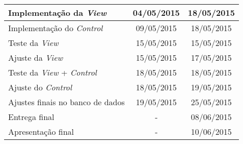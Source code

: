 \documentclass[a4paper,12pt]{article}
\begin{document}
{\begin{longtable}{|l|c|c|}
\hline
\rowcolor{ultramarineblue}
Implementação da \textit{View}            & 04/05/2015                           & 18/05/2015                        \\ \hline

\hline
\rowcolor{ultramarineblue}
Implementação do \textit{Control}         & 09/05/2015                           & 18/05/2015                        \\ \hline



Teste da \textit{View}                    & 15/05/2015                           & 15/05/2015                        \\ \hline
Ajuste da \textit{View}                   & 15/05/2015                           & 17/05/2015                        \\ \hline
Teste da \textit{View} + \textit{Control} & 18/05/2015                           & 18/05/2015                        \\ \hline
Ajuste do \textit{Control}                & 18/05/2015                           & 19/05/2015                        \\ \hline
Ajustes finais no banco de dados          & 19/05/2015                           & 25/05/2015                        \\ \hline
Entrega final                             & \multicolumn{1}{c|}{-}               & 08/06/2015                        \\ \hline
Apresentação final                        & \multicolumn{1}{c|}{-}               & 10/06/2015                        \\ \hline
\end{longtable}
}
\end{document}
